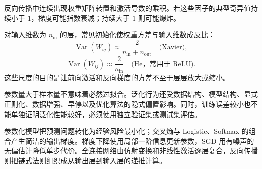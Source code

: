 反向传播中连续出现权重矩阵转置和激活导数的乘积。若这些因子的典型奇异值持续小于 $1$，梯度可能指数衰减；持续大于 $1$ 则可能爆炸。

对输入维数为 $n_{\mathrm{in}}$ 的层，常见初始化使权重方差与输入维数成反比：
\[
\operatorname{Var}(W_{ij})\approx\frac{2}{n_{\mathrm{in}}+n_{\mathrm{out}}}
\quad\text{(Xavier)},
\]
\[
\operatorname{Var}(W_{ij})\approx\frac{2}{n_{\mathrm{in}}}
\quad\text{(He，常用于 ReLU)}.
\]
这些尺度的目的是让前向激活和反向梯度的方差不至于层层放大或缩小。

参数量大于样本量不意味着必然过拟合。泛化行为还受数据结构、模型结构、显式正则化、数据增强、早停以及优化算法的隐式偏置影响。同时，训练误差较小也不能单独证明泛化性能较好，必须使用独立验证集或测试集评估。

\begin{summary}[本章知识链]
参数化模型把预测问题转化为经验风险最小化；交叉熵与 Logistic、Softmax 的组合产生简洁的输出梯度。梯度下降使用局部一阶信息更新参数，SGD 用有噪声的无偏估计降低单步代价。全连接网络由仿射变换和非线性激活逐层复合，反向传播则把链式法则组织成从输出层到输入层的递推计算。
\end{summary}
